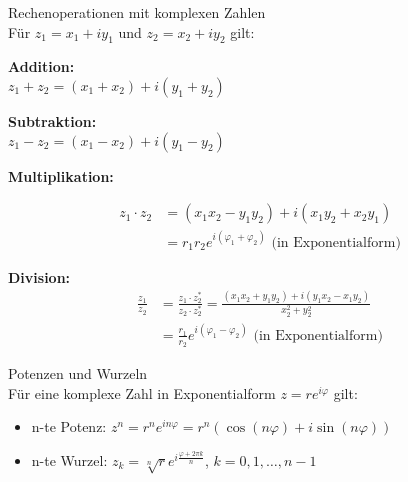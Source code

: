 \begin{theorem}{Rechenoperationen mit komplexen Zahlen}\\
Für $z_1 = x_1 + iy_1$ und $z_2 = x_2 + iy_2$ gilt:
\vspace{1mm}\\
\begin{minipage}[t]{0.45\textwidth}
    \textbf{Addition:}\\
    $z_1 + z_2 = (x_1 + x_2) + i(y_1 + y_2)$
\end{minipage}
\hspace{3mm}
\begin{minipage}[t]{0.45\textwidth}
    \textbf{Subtraktion:}\\
    $z_1 - z_2 = (x_1 - x_2) + i(y_1 - y_2)$
\end{minipage}

\begin{minipage}{0.28\textwidth}
    \textbf{Multiplikation:}
\end{minipage}
\begin{minipage}{0.68\textwidth}
    \begin{align*}
        z_1 \cdot z_2 &= (x_1x_2 - y_1y_2) + i(x_1y_2 + x_2y_1)\\
        &= r_1r_2e^{i(\varphi_1 + \varphi_2)} \text{ (in Exponentialform)}
    \end{align*}
\end{minipage}



\textbf{Division:}
\begin{align*}
    \frac{z_1}{z_2} &= \frac{z_1 \cdot z_2^*}{z_2 \cdot z_2^*} = \frac{(x_1x_2 + y_1y_2) + i(y_1x_2 - x_1y_2)}{x_2^2 + y_2^2}\\
    &= \frac{r_1}{r_2}e^{i(\varphi_1 - \varphi_2)} \text{ (in Exponentialform)}
\end{align*}
\end{theorem}

\begin{theorem}{Potenzen und Wurzeln}\\
Für eine komplexe Zahl in Exponentialform $z = re^{i\varphi}$ gilt:
\begin{itemize}
    \item n-te Potenz: $z^n = r^ne^{in\varphi} = r^n(\cos(n\varphi) + i\sin(n\varphi))$
    \item n-te Wurzel: $z_k = \sqrt[n]{r}e^{i\frac{\varphi + 2\pi k}{n}}$, $k = 0,1,\ldots,n-1$
\end{itemize}
\end{theorem}


